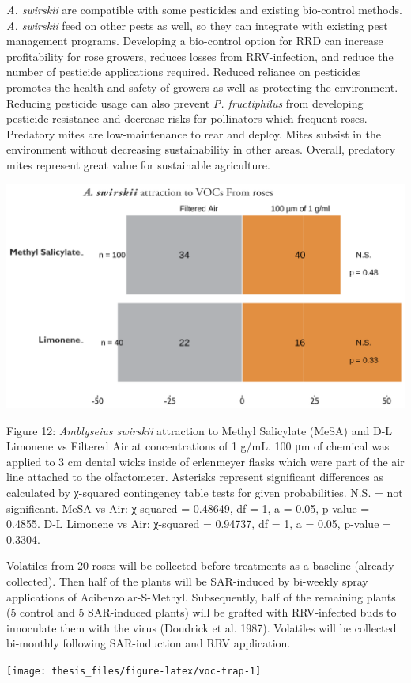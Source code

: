 \documentclass[12pt,final,CPage]{ufthesis}
\begin{document}
{  \emph{A. swirskii} are compatible with some pesticides and existing bio-control methods. \emph{A. swirskii} feed on other pests as well, so they can integrate with existing pest management programs. Developing a bio-control option for RRD can increase profitability for rose growers, reduces losses from RRV-infection, and reduce the number of pesticide applications required. Reduced reliance on pesticides promotes the health and safety of growers as well as protecting the environment. Reducing pesticide usage can also prevent \emph{P. fructiphilus} from developing pesticide resistance and decrease risks for pollinators which frequent roses. Predatory mites are low-maintenance to rear and deploy. Mites subsist in the environment without decreasing sustainability in other areas. Overall, predatory mites represent great value for sustainable agriculture.
  \begin{center}\includegraphics[width=0.8\linewidth]{figure/tests_graph} \end{center}

  Figure 12: \emph{Amblyseius swirskii} attraction to Methyl Salicylate (MeSA) and D-L Limonene vs Filtered Air at concentrations of 1 g/mL. 100 μm of chemical was applied to 3 cm dental wicks inside of erlenmeyer flasks which were part of the air line attached to the olfactometer. Asterisks represent significant differences as calculated by χ-squared contingency table tests for given probabilities. N.S. = not significant. MeSA vs Air: χ-squared = 0.48649, df = 1, a = 0.05, p-value = 0.4855. D-L Limonene vs Air: χ-squared = 0.94737, df = 1, a = 0.05, p-value = 0.3304.

  Volatiles from 20 roses will be collected before treatments as a baseline (already collected). Then half of the plants will be SAR-induced by bi-weekly spray applications of Acibenzolar-S-Methyl. Subsequently, half of the remaining plants (5 control and 5 SAR-induced plants) will be grafted with RRV-infected buds to innoculate them with the virus (Doudrick et al. 1987). Volatiles will be collected bi-monthly following SAR-induction and RRV application.
  \begin{center}\texttt{[image: thesis\_files/figure-latex/voc-trap-1]} \end{center}

}
\end{document}
